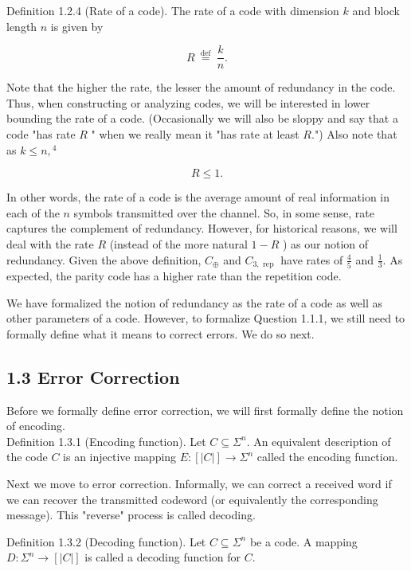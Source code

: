 \documentclass[10pt]{article}
\begin{document}
Definition 1.2.4 (Rate of a code). The rate of a code with dimension $k$ and block length $n$ is given by

$$
R \stackrel{\text { def }}{=} \frac{k}{n} .
$$

Note that the higher the rate, the lesser the amount of redundancy in the code. Thus, when constructing or analyzing codes, we will be interested in lower bounding the rate of a code. (Occasionally we will also be sloppy and say that a code "has rate $R$ " when we really mean it "has rate at least $R$.") Also note that as $k \leq n,{ }^{4}$

$$
R \leq 1 .
$$

In other words, the rate of a code is the average amount of real information in each of the $n$ symbols transmitted over the channel. So, in some sense, rate captures the complement of redundancy. However, for historical reasons, we will deal with the rate $R$ (instead of the more natural $1-R$ ) as our notion of redundancy. Given the above definition, $C_{\oplus}$ and $C_{3, \text { rep }}$ have rates of $\frac{4}{5}$ and $\frac{1}{3}$. As expected, the parity code has a higher rate than the repetition code.

We have formalized the notion of redundancy as the rate of a code as well as other parameters of a code. However, to formalize Question 1.1.1, we still need to formally define what it means to correct errors. We do so next.

\subsection*{1.3 Error Correction}
Before we formally define error correction, we will first formally define the notion of encoding.\\
Definition 1.3.1 (Encoding function). Let $C \subseteq \Sigma^{n}$. An equivalent description of the code $C$ is an injective mapping $E:[|C|] \rightarrow \Sigma^{n}$ called the encoding function.

Next we move to error correction. Informally, we can correct a received word if we can recover the transmitted codeword (or equivalently the corresponding message). This "reverse" process is called decoding.

Definition 1.3.2 (Decoding function). Let $C \subseteq \Sigma^{n}$ be a code. A mapping $D: \Sigma^{n} \rightarrow[|C|]$ is called a decoding function for $C$.
\end{document}
